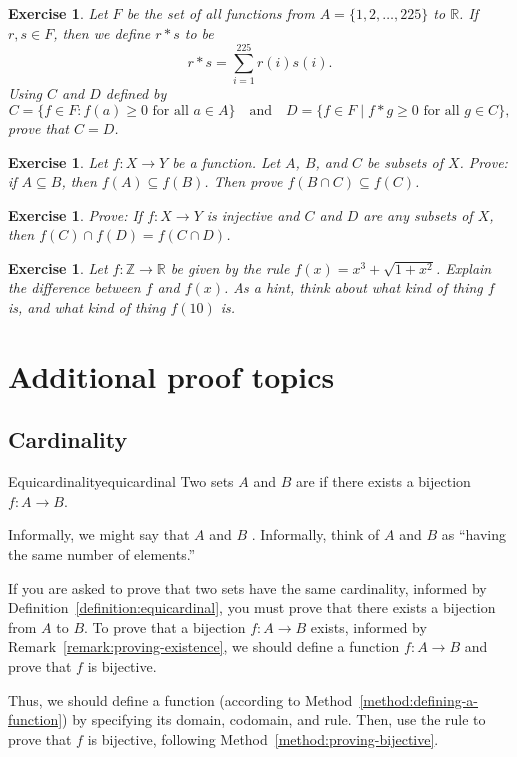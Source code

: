 \documentclass{book}
\newcounter{ekcounter}%
\theoremstyle{ekimcustom}
\newtheorem{exercise}[ekcounter]{Exercise}
\newcommand\defn[1]{{\color{blue}{\bf #1}}}
\begin{document}
\begin{exercise}
Let $F$ be the set of all functions from $A=\{1,2,\dots,225\}$ to $\mathbb{R}$. If $r,s \in F$, then we define $r \ast s$ to be
\[r \ast s = \sum_{i=1}^{225} r(i)s(i).\]
Using $C$ and $D$ defined by
\[C = \{ f \in F : f(a) \geq 0 \text{ for all } a \in A\}
\quad\text{and}\quad
D = \{f \in F \mid f \ast g \geq 0 \text{ for all } g \in C\},\]
prove that $C=D$.
\end{exercise}

\begin{exercise}
Let $f: X \to Y$ be a function. Let $A$, $B$, and $C$ be subsets of $X$. Prove: if $A \subseteq B$, then $f(A) \subseteq f(B)$. Then prove $f(B \cap C) \subseteq f(C)$.
\end{exercise}

\begin{exercise}
Prove: If $f : X \to Y$ is injective and $C$ and $D$ are any subsets of $X$, then $f(C) \cap f(D) = f(C \cap D)$.
\end{exercise}

\begin{exercise}
Let $f : \mathbb{Z} \to \mathbb{R}$ be given by the rule $f(x) = x^3 + \sqrt{1+x^2}$. Explain the difference between $f$ and $f(x)$. As a hint, think about what kind of thing $f$ is, and what kind of thing $f(10)$ is.%
\end{exercise}

\chapter{Additional proof topics}

\section{Cardinality}\label{section:cardinality}

\begin{bdefinition}{Equicardinality}{equicardinal}
Two sets $A$ and $B$ are \defn{equicardinal} if there exists a bijection $f : A \to B$.
\end{bdefinition}
Informally, we might say that $A$ and $B$ \defn{have the same cardinality}. Informally, think of $A$ and $B$ as ``having the same number of elements.''

\begin{bmethod}{}{}
If you are asked to prove that two sets have the same cardinality, informed by Definition~\ref{definition:equicardinal}, you must prove that there exists a bijection from $A$ to $B$. To prove that a bijection $f : A \to B$ exists, informed by Remark~\ref{remark:proving-existence}, we should define a function $f: A \to B$ and prove that $f$ is bijective.

Thus, we should define a function (according to Method~\ref{method:defining-a-function}) by specifying its domain, codomain, and rule. Then, use the rule to prove that $f$ is bijective, following Method~\ref{method:proving-bijective}.
\end{bmethod}
\end{document}
